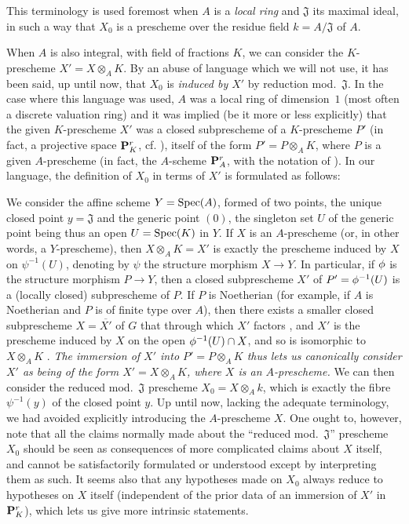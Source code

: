 \begin{env}
\label{I.3.7.2}
This terminology is used foremost when $A$ is a \emph{local ring} and $\mathfrak{J}$ its maximal ideal, in such a way that $X_0$ is a prescheme over the residue field $k=A/\mathfrak{J}$ of $A$.

When $A$ is also integral, with field of fractions $K$, we can consider the $K$-prescheme $X'=X\otimes_A K$.
By an abuse of language which we will not use, it has been said, up until now, that $X_0$ is \emph{induced by $X'$} by reduction mod.~$\mathfrak{J}$.
In the case where this language was used, $A$ was a local ring of dimension~$1$ (most often a discrete valuation ring) and it was implied (be it more or less explicitly) that the given $K$-prescheme $X'$ was a closed subprescheme of a $K$-prescheme $P'$ (in fact, a projective space  $\mathbf{P}_K^r$, cf. ), itself of the form $P'=P\otimes_A K$, where $P$ is a given $A$-prescheme (in fact, the $A$-scheme $\mathbf{P}_A^r$, with the notation of ).
In our language, the definition of $X_0$ in terms of $X'$ is formulated as follows:

We consider the affine scheme $Y=\operatorname{Spec}(A)$, formed of two points, the unique closed point
$y=\mathfrak{J}$ and the generic point $(0)$, the singleton set $U$ of the generic point being thus an open $U=\operatorname{Spec}(K)$ in $Y$.
If $X$ is an $A$-prescheme (or, in other words, a $Y$-prescheme), then $X\otimes_A K=X'$ is exactly the prescheme induced by $X$ on $\psi^{-1}(U)$, denoting by $\psi$ the structure morphism $X\to Y$.
In particular, if $\phi$ is the structure morphism $P\to Y$, then a closed subprescheme $X'$ of $P'=\phi^{-1}(U)$ is a (locally closed) subprescheme of $P$.
If $P$ is Noetherian (for example, if $A$ is Noetherian and $P$ is of finite type over $A$), then there exists a smaller closed subprescheme $X=\overline{X'}$ of $G$ that through which $X'$ factors , and $X'$ is the prescheme induced by $X$ on the open $\phi^{-1}(U)\cap X$, and so is isomorphic to $X\otimes_A K$ .
\emph{The immersion of $X'$ into $P'=P\otimes_A K$ thus lets us canonically consider $X'$ as being of the form $X'=X\otimes_A K$, where $X$ is an $A$-prescheme.}
We can then consider the reduced mod.~$\mathfrak{J}$ prescheme $X_0=X\otimes_A k$, which is exactly the fibre $\psi^{-1}(y)$ of the closed point $y$.
Up until now, lacking the adequate terminology, we had avoided explicitly introducing the $A$-prescheme $X$.
One ought to, however, note that all the claims normally made about the ``reduced mod.~$\mathfrak{J}$'' prescheme  $X_0$ should be seen as consequences of more complicated claims about $X$ itself, and cannot be satisfactorily formulated or understood except by interpreting them as such.
It seems also that any hypotheses made on $X_0$ always reduce to hypotheses on $X$ itself (independent of the prior data of an immersion of $X'$ in $\mathbf{P}_K^r$), which lets us give more intrinsic statements.
\end{env}

